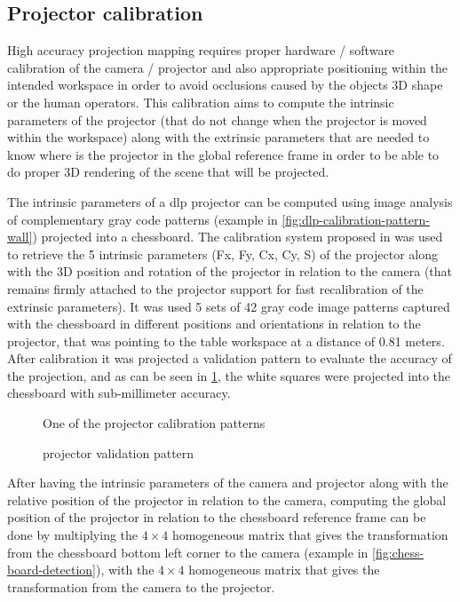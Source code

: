 \subsection{Projector calibration}

High accuracy projection mapping requires proper hardware / software calibration of the camera / projector and also appropriate positioning within the intended workspace in order to avoid occlusions caused by the objects 3D shape or the human operators. This calibration aims to compute the intrinsic parameters of the projector (that do not change when the projector is moved within the workspace) along with the extrinsic parameters that are needed to know where is the projector in the global reference frame in order to be able to do proper 3D rendering of the scene that will be projected.

The intrinsic parameters of a \gls{dlp} projector can be computed using image analysis of complementary gray code patterns (example in \cref{fig:dlp-calibration-pattern-wall}) projected into a chessboard. The calibration system proposed in \cite{Moreno2012} was used to retrieve the 5 intrinsic parameters (Fx, Fy, Cx, Cy, S) of the projector along with the 3D position and rotation of the projector in relation to the camera (that remains firmly attached to the projector support for fast recalibration of the extrinsic parameters). It was used 5 sets of 42 gray code image patterns captured with the chessboard in different positions and orientations in relation to the projector, that was pointing to the table workspace at a distance of 0.81 meters. After calibration it was projected a validation pattern to evaluate the accuracy of the projection, and as can be seen in \cref{fig:dlp-projected-chessboard}, the white squares were projected into the chessboard with sub-millimeter accuracy.

\begin{figure}[H]
	\begin{floatrow}[2]
		{\caption{One of the  projector calibration patterns}\label{fig:dlp-calibration-pattern-wall}}
		{\caption{ projector validation pattern}\label{fig:dlp-projected-chessboard}}
	\end{floatrow}
\end{figure}

After having the intrinsic parameters of the camera and projector along with the relative position of the projector in relation to the camera, computing the global position of the projector in relation to the chessboard reference frame can be done by multiplying the $4 \times 4$ homogeneous matrix that gives the transformation from the chessboard bottom left corner to the camera (example in \cref{fig:chess-board-detection}), with the $4 \times 4$ homogeneous matrix that gives the transformation from the camera to the projector.

